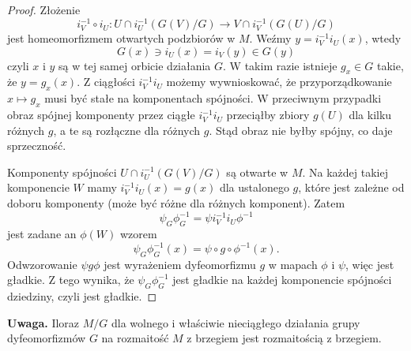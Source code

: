 \begin{proof}
  Złożenie
  $$i_V^{-1}\circ i_U:U\cap i_U^{-1}(G(V)/G)\to V\cap i_V^{-1}(G(U)/G)$$
  jest homeomorfizmem otwartych podzbiorów w $M$. Weźmy $y=i_V^{-1}i_U(x)$, wtedy
  $$G(x)\ni i_U(x)=i_V(y)\in G(y)$$
  czyli $x$ i $y$ są w tej samej orbicie działania $G$. W takim razie istnieje $g_x\in G$ takie, że $y=g_x(x)$. Z ciągłości $i_V^{-1}i_U$ możemy wywnioskować, że przyporządkowanie $x\mapsto g_x$ musi być stałe na komponentach spójności. W przeciwnym przypadki obraz spójnej komponenty przez ciągłe $i_V^{-1}i_U$ przeciąłby zbiory $g(U)$ dla kilku różnych $g$, a te są rozłączne dla różnych $g$. Stąd obraz nie byłby spójny, co daje sprzeczność.

  Komponenty spójności $U\cap i_U^{-1}(G(V)/G)$ są otwarte w $M$. Na każdej takiej komponencie $W$ mamy $i_V^{-1}i_U(x)=g(x)$ dla ustalonego $g$, które jest zależne od doboru komponenty (może być różne dla różnych komponent). Zatem 
  $$\psi_G\phi_G^{-1}=\psi i_V^{-1}i_U\phi^{-1}$$
  jest zadane an $\phi(W)$ wzorem
  $$\psi_G\phi_G^{-1}(x)=\psi\circ g\circ\phi^{-1}(x).$$
  Odwzorowanie $\psi g\phi$ jest wyrażeniem dyfeomorfizmu $g$ w mapach $\phi$ i $\psi$, więc jest gładkie. Z tego wynika, że $\psi_G\phi_G^{-1}$ jest gładkie na każdej komponencie spójności dziedziny, czyli jest gładkie.
\end{proof}

\textbf{\large\color{blue}Uwaga.} Iloraz $M/G$ dla wolnego i właściwie nieciągłego działania grupy dyfeomorfizmów $G$ na rozmaitość $M$ z brzegiem jest rozmaitością z brzegiem.

